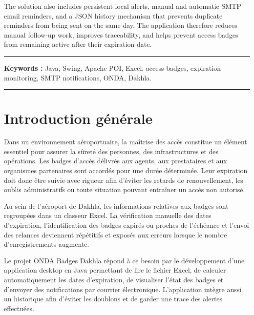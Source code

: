 \documentclass[12pt,a4paper,openany]{report}
\begin{document}
The solution also includes persistent local alerts, manual and automatic SMTP
email reminders, and a JSON history mechanism that prevents duplicate reminders
from being sent on the same day. The application therefore reduces manual
follow-up work, improves traceability, and helps prevent access badges from
remaining active after their expiration date.

\vspace{0.5cm}
\noindent\rule{\linewidth}{0.4pt}

\vspace{0.2cm}
\noindent\textbf{Keywords :} Java, Swing, Apache POI, Excel, access badges, expiration monitoring, SMTP notifications, ONDA, Dakhla.

\vspace{0.2cm}
\noindent\rule{\linewidth}{0.4pt}


\cleardoublepage

\begingroup
\let\clearpage\relax
\let\cleardoublepage\relax
\tableofcontents
\vspace{1cm}
\listoffigures
\endgroup
\enlargethispage{\baselineskip}
\chapter*{Introduction générale}

Dans un environnement aéroportuaire, la maîtrise des accès constitue un élément
essentiel pour assurer la sûreté des personnes, des infrastructures et des
opérations. Les badges d'accès délivrés aux agents, aux prestataires et aux
organismes partenaires sont accordés pour une durée déterminée. Leur expiration
doit donc être suivie avec rigueur afin d'éviter les retards de renouvellement,
les oublis administratifs ou toute situation pouvant entraîner un accès non
autorisé.

Au sein de l'aéroport de Dakhla, les informations relatives aux badges sont
regroupées dans un classeur Excel. La vérification manuelle des dates
d'expiration, l'identification des badges expirés ou proches de l'échéance et
l'envoi des relances deviennent répétitifs et exposés aux erreurs lorsque le
nombre d'enregistrements augmente.

Le projet \og ONDA Badges Dakhla \fg{} répond à ce besoin par le développement
d'une application desktop en Java permettant de lire le fichier Excel, de calculer
automatiquement les dates d'expiration, de visualiser l'état des badges et
d'envoyer des notifications par courrier électronique. L'application intègre aussi
un historique afin d'éviter les doublons et de garder une trace des alertes
effectuées.
\end{document}
